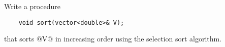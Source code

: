 
Write a procedure

\begin{lstlisting}
    void sort(vector<double>& V);
\end{lstlisting}

that sorts @V@ in increasing order using the selection sort algorithm.


\ObservationNoMain

